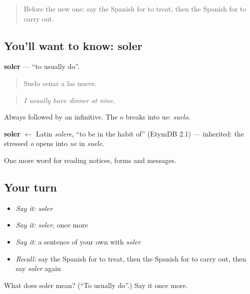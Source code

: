 \label{lesson:ES-C511-soler}



\begin{quote}
Before the new one: say the Spanish for to treat, then the Spanish for to carry out.
\end{quote}

\subsection*{You'll want to know: soler}
\textbf{soler} — \textquotedblleft{}to usually do\textquotedblright{}.

\begin{quote}
Suelo cenar a las nueve.
\end{quote}

\begin{quote}
\emph{I usually have dinner at nine.}
\end{quote}

Always followed by an infinitive. The o breaks into ue: \emph{suelo}.

\begin{cousinweb}
\textbf{soler} $\leftarrow$ Latin \emph{solere}, \textquotedblleft{}to be in the habit of\textquotedblright{} (EtymDB 2.1) — inherited: the stressed \emph{o} opens into \emph{ue} in \emph{suele}.
\end{cousinweb}

\begin{grammarlens}[title={What you've built}]
One more word for reading notices, forms and messages.
\end{grammarlens}

\subsection*{Your turn}
\begin{itemize}
\raggedright
  \item \emph{Say it:} \emph{soler}
  \item \emph{Say it:} \emph{soler}, once more
  \item \emph{Say it:} a sentence of your own with \emph{soler}
  \item \emph{Recall:} say the Spanish for to treat, then the Spanish for to carry out, then say \emph{soler} again
\end{itemize}

\begin{tcolorbox}[breakable,colback=teal!4,colframe=teal!35!black,title={Before you move on}]
What does soler mean? (\textquotedblleft{}To usually do\textquotedblright{}.) Say it once more.
\end{tcolorbox}
